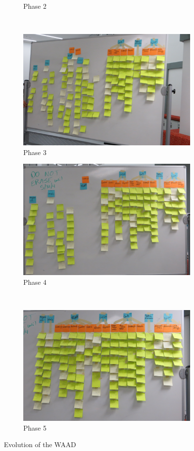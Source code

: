 \documentclass[12pt]{article} %
\begin{document}
\begin{figure}[H]
\begin{subfigure}{.5\linewidth}
      \caption{Phase 2}
      \label{fig:WAAD_version2}
    \end{subfigure}\\[1ex]
    \begin{subfigure}{.5\linewidth}
      \centering
      \includegraphics[width=0.95\linewidth]{WAAD_version3}
      \caption{Phase 3}
      \label{fig:WAAD_version3}
    \end{subfigure}%
    \begin{subfigure}{.5\linewidth}
      \centering
      \includegraphics[width=0.95\linewidth]{WAAD_version4}
      \caption{Phase 4}
      \label{fig:WAAD_version4}
    \end{subfigure}\\[1ex]
    \begin{subfigure}{\linewidth}
      \centering
      \includegraphics[width=0.55\linewidth]{WAAD_version5}
      \caption{Phase 5}
      \label{fig:WAAD_version5}
    \end{subfigure}
    \caption{Evolution of the WAAD}
    \label{fig:WAAD}
  \end{figure}
\end{document}
